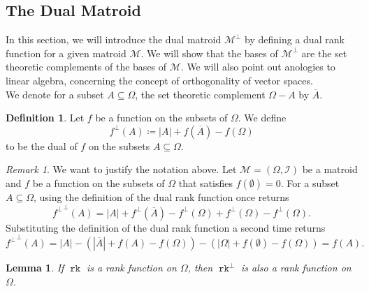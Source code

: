 \documentclass[12pt,a4paper, twoside, autooneside=false]{scrartcl}
\newtheorem{lemma}[theorem]{Lemma}
\theoremstyle{definition}
\newtheorem{definition}[theorem]{Definition}
\theoremstyle{remark}
\newtheorem{remark}[theorem]{Remark}
\numberwithin{equation}{section}
\DeclareMathOperator{\rk}{\mathtt{rk}}
\newcommand{\M}{\mathcal{M}} %
\begin{document}
\subsection{The Dual Matroid}
In this section, we will introduce the dual matroid $\M^\perp$ by defining a dual rank function for a given matroid $\M$. We will show that the bases of $\M^\perp$ are the set theoretic complements of the bases of $\M$. We will also point out anologies to linear algebra, concerning the concept of orthogonality of vector spaces.\\ 
\indent We denote for a subset $A \subseteq \Omega$, the set theoretic complement $\Omega - A$ by $\overline{A}$.
\begin{definition}
Let $f$ be a function on the subsets of $\Omega$. We define
\[
f^\perp(A) \coloneqq |A| + f(\overline{A}) - f(\Omega)
\]
to be the dual of $f$ on the subsets $A \subseteq \Omega$.
\end{definition}
\begin{remark}
We want to justify the notation above. Let $\M = (\Omega,\mathcal{I})$ be a matroid and $f$ be a function on the subsets of $\Omega$ that satisfies $f(\emptyset) = 0$. For a subset $A \subseteq \Omega$, using the definition of the dual rank function once returns
\[
{f^\perp}^\perp(A) = |A| + f^\perp(\overline{A}) - f^\perp(\Omega) + f^\perp(\Omega) - f^\perp(\Omega). 
\] 
Substituting the definition of the dual rank function a second time returns 
\[
{f^\perp}^\perp(A) = |A| - (|\overline{A}| + f(A) - f(\Omega)) - (|\Omega| + f(\emptyset) - f(\Omega)) = f(A).
\]
\end{remark}
\begin{lemma}
If $\rk$ is a rank function on $\Omega$, then $\rk^\perp$ is also a rank function on $\Omega$. 
\end{lemma}
\end{document}
